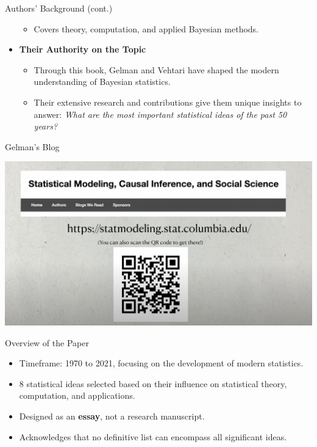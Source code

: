 \documentclass{beamer}
\begin{document}
\begin{frame}{Authors' Background (cont.)}
\begin{minipage}{0.6\textwidth}
\begin{itemize}
\begin{itemize}
            \item Covers theory, computation, and applied Bayesian methods.
        \end{itemize}
        \vspace{0.5em} %
        \item \textbf{Their Authority on the Topic}
        \begin{itemize}
            \item Through this book, Gelman and Vehtari have shaped the modern understanding of Bayesian statistics.
            \item Their extensive research and contributions give them unique insights to answer: \textit{What are the most important statistical ideas of the past 50 years?}
        \end{itemize}
    \end{itemize}
\end{minipage}
\end{frame}



\begin{frame}{Gelman's Blog}
\begin{center}
    \includegraphics[width=\textwidth]{statistical_modeling_blog.png} %
\end{center}
\end{frame}


\begin{frame}{Overview of the Paper}
\begin{itemize}
    \item Timeframe: 1970 to 2021, focusing on the development of modern statistics.
    \item 8 statistical ideas selected based on their influence on statistical theory, computation, and applications.
    \item Designed as an \textbf{essay}, not a research manuscript.
            \item Acknowledges that no definitive list can encompass all significant ideas.
\end{itemize}
\end{frame}
\end{document}
